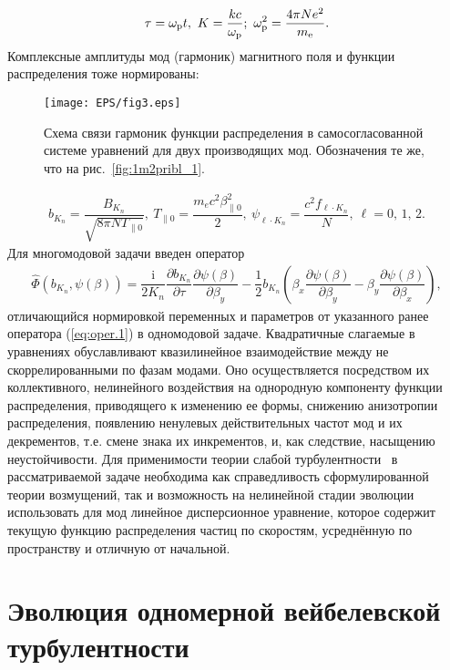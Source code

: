 \begin{align}
\label{eq19plus2}
    \tau=\wpl t, \
    K=\dfrac{kc}{\wpl}; \ 
    \wpl^2=\dfrac{4\pi Ne^2}{\me}.
\end{align}
Комплексные амплитуды мод (гармоник) магнитного поля и функции распределения тоже нормированы:
\begin{figure}[b]
\centering
\texttt{[image: EPS/fig3.eps]}
\caption{Схема связи гармоник функции распределения в самосогласованной системе уравнений для двух производящих мод. Обозначения те же, что на рис.~\ref{fig:1m2pribl_1}.}
\label{fig:2m2pribl}
\end{figure}


\begin{align}
\label{eq19plus1}
    b_{K_{n}}=\dfrac{B_{K_{n}}}{\sqrt{8\pi N T_{\|0}}},\
    T_{\|0}=\dfrac{m_ec^2\beta_{\|0}^2}{2},\  \psi_{\ell\cdot K_{n}}=\dfrac{c^2f_{\ell\cdot K_{n}}}{N},
    \ \ell=0,\,1,\,2.  
\end{align}
Для многомодовой задачи введен оператор 
\begin{align}
\label{eq:oper.2}\hat \Phi(b_{K_n},\psi(\beta)) =  \dfrac{\mathrm{i}}{2K_n}\dfrac{\partial b_{K_n}}{\partial \tau}\dfrac{\partial \psi(\beta)}{\partial \beta_y} -\dfrac{1}{2}b_{K_n} \left(\beta_x\dfrac{\partial \psi(\beta)}{\partial \beta_y}-\beta_y\dfrac{\partial \psi(\beta)}{\partial \beta_x}\right) ,
\end{align}
отличающийся нормировкой переменных и параметров от указанного ранее оператора (\ref{eq:oper.1}) в одномодовой задаче. Квадратичные слагаемые в уравнениях обуславливают квазилинейное взаимодействие между не скоррелированными по фазам модами. Оно осуществляется посредством их коллективного, нелинейного воздействия на однородную компоненту функции распределения, приводящего к изменению ее формы, снижению анизотропии распределения, появлению ненулевых действительных частот мод и их декрементов, т.е. смене знака их инкрементов, и, как следствие, насыщению неустойчивости. Для применимости теории слабой турбулентности~\cite{Krall1975,Vedenov1962} в рассматриваемой задаче необходима как справедливость сформулированной теории возмущений, так и возможность на нелинейной стадии эволюции использовать для мод линейное дисперсионное уравнение, которое содержит текущую функцию распределения частиц по скоростям, усреднённую по пространству и отличную от начальной.


\section{Эволюция одномерной вейбелевской турбулентности}\label{sec:ch1/sec2}

